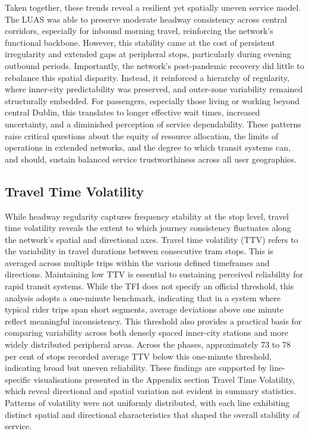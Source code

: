     Taken together, these trends reveal a resilient yet spatially uneven service model. The LUAS was able to preserve moderate headway consistency across central corridors, especially for inbound morning travel, reinforcing the network’s functional backbone. However, this stability came at the cost of persistent irregularity and extended gaps at peripheral stops, particularly during evening outbound periods. Importantly, the network’s post-pandemic recovery did little to rebalance this spatial disparity. Instead, it reinforced a hierarchy of regularity, where inner-city predictability was preserved, and outer-zone variability remained structurally embedded. For passengers, especially those living or working beyond central Dublin, this translates to longer effective wait times, increased uncertainty, and a diminished perception of service dependability. These patterns raise critical questions about the equity of resource allocation, the limits of operations in extended networks, and the degree to which transit systems can, and should, sustain balanced service trustworthiness across all user geographies.

\subsection*{Travel Time Volatility}

    While headway regularity captures frequency stability at the stop level, travel time volatility reveals the extent to which journey consistency fluctuates along the network’s spatial and directional axes. Travel time volatility (TTV) refers to the variability in travel durations between consecutive tram stops. This is averaged across multiple trips within the various defined timeframes and directions. Maintaining low TTV is essential to sustaining perceived reliability for rapid transit systems. While the TFI does not specify an official threshold, this analysis adopts a one-minute benchmark, indicating that in a system where typical rider trips span short segments, average deviations above one minute reflect meaningful inconsistency. This threshold also provides a practical basis for comparing variability across both densely spaced inner-city stations and more widely distributed peripheral areas. Across the phases, approximately 73 to 78 per cent of stops recorded average TTV below this one-minute threshold, indicating broad but uneven reliability. These findings are supported by line-specific visualisations presented in the Appendix section Travel Time Volatility, which reveal directional and spatial variation not evident in summary statistics. Patterns of volatility were not uniformly distributed, with each line exhibiting distinct spatial and directional characteristics that shaped the overall stability of service.

